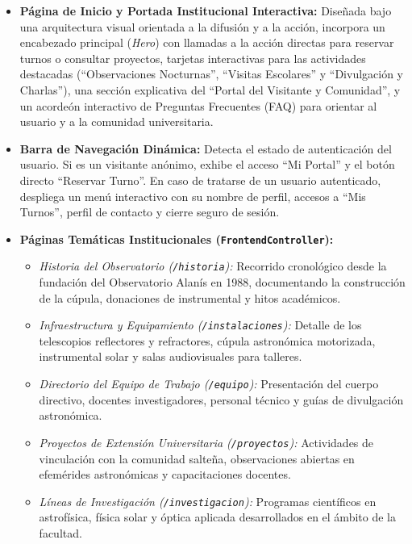 \begin{itemize}
    \item \textbf{Página de Inicio y Portada Institucional Interactiva:} Diseñada bajo una arquitectura visual orientada a la difusión y a la acción, incorpora un encabezado principal (\textit{Hero}) con llamadas a la acción directas para reservar turnos o consultar proyectos, tarjetas interactivas para las actividades destacadas (``Observaciones Nocturnas'', ``Visitas Escolares'' y ``Divulgación y Charlas''), una sección explicativa del ``Portal del Visitante y Comunidad'', y un acordeón interactivo de Preguntas Frecuentes (FAQ) para orientar al usuario y a la comunidad universitaria.
    \item \textbf{Barra de Navegación Dinámica:} Detecta el estado de autenticación del usuario. Si es un visitante anónimo, exhibe el acceso ``Mi Portal'' y el botón directo ``Reservar Turno''. En caso de tratarse de un usuario autenticado, despliega un menú interactivo con su nombre de perfil, accesos a ``Mis Turnos'', perfil de contacto y cierre seguro de sesión.
    \item \textbf{Páginas Temáticas Institucionales (\texttt{FrontendController}):}
        \begin{itemize}
            \item \textit{Historia del Observatorio (\texttt{/historia}):} Recorrido cronológico desde la fundación del Observatorio Alanís en 1988, documentando la construcción de la cúpula, donaciones de instrumental y hitos académicos.
            \item \textit{Infraestructura y Equipamiento (\texttt{/instalaciones}):} Detalle de los telescopios reflectores y refractores, cúpula astronómica motorizada, instrumental solar y salas audiovisuales para talleres.
            \item \textit{Directorio del Equipo de Trabajo (\texttt{/equipo}):} Presentación del cuerpo directivo, docentes investigadores, personal técnico y guías de divulgación astronómica.
            \item \textit{Proyectos de Extensión Universitaria (\texttt{/proyectos}):} Actividades de vinculación con la comunidad salteña, observaciones abiertas en efemérides astronómicas y capacitaciones docentes.
            \item \textit{Líneas de Investigación (\texttt{/investigacion}):} Programas científicos en astrofísica, física solar y óptica aplicada desarrollados en el ámbito de la facultad.
        \end{itemize}
\end{itemize}

